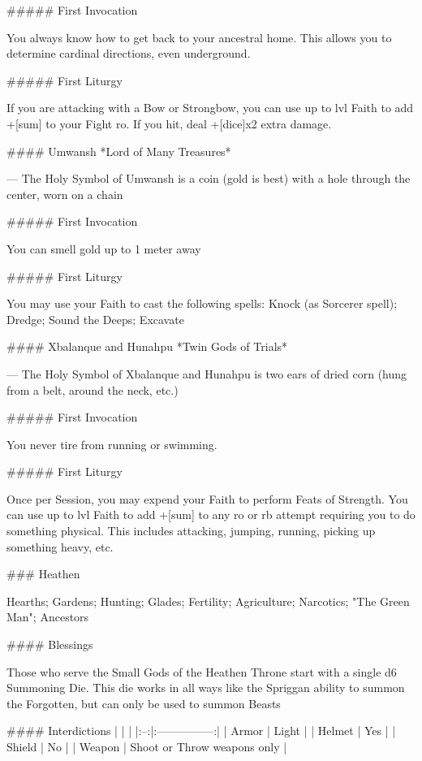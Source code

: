##### First Invocation

You always know how to get back to your ancestral home. This allows you to determine cardinal directions, even underground.

##### First Liturgy

If you are attacking with a Bow or Strongbow, you can use up to {lvl} Faith to add +[sum] to your Fight {ro}.  If you hit, deal +[dice]x2 extra damage.




#### Umwansh
*Lord of Many Treasures*

---
The Holy Symbol of Umwansh is a coin (gold is best) with a hole through the center, worn on a chain

##### First Invocation

You can smell gold up to 1 meter away

##### First Liturgy

You may use your Faith to cast the following spells:  Knock (as Sorcerer spell); Dredge; Sound the Deeps; Excavate




#### Xbalanque and Hunahpu
*Twin Gods of Trials*

---
The Holy Symbol of Xbalanque and Hunahpu is two ears of dried corn (hung from a belt, around the neck, etc.)

##### First Invocation

You never tire from running or swimming.  

##### First Liturgy

Once per Session, you may expend your Faith to perform Feats of Strength.  You can use up to {lvl} Faith to add +[sum] to any {ro} or {rb} attempt requiring you to do something physical.  This includes attacking, jumping, running, picking up something heavy, etc.



### Heathen



Hearths; Gardens; Hunting; Glades; Fertility; Agriculture; Narcotics; "The Green Man"; Ancestors



#### Blessings

Those who serve the Small Gods of the Heathen Throne start with a single d6 Summoning Die.  This die works in all ways like the Spriggan ability to summon the Forgotten, but can only be used to summon Beasts

#### Interdictions
| | |
|:--:|:---------------:|
| Armor | Light |
| Helmet | Yes |
| Shield | No |
| Weapon | Shoot or Throw weapons only |

